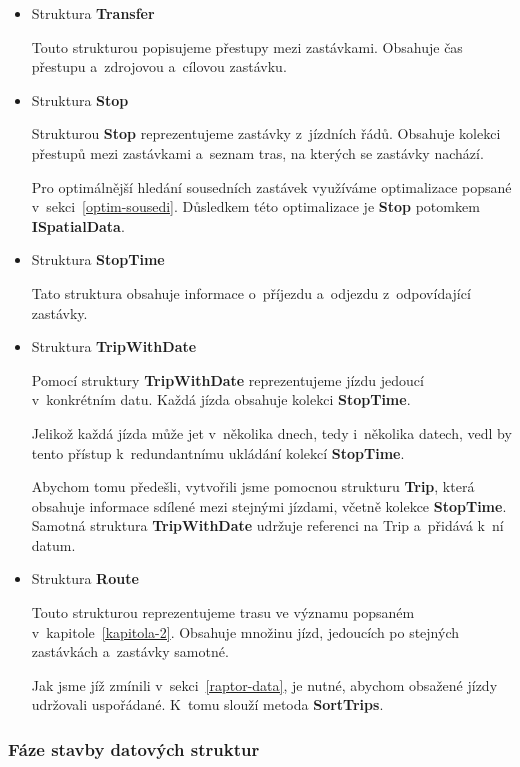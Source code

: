 \begin{itemize}
    \item Struktura \textbf{Transfer}
    
    Touto strukturou popisujeme přestupy mezi zastávkami. Obsahuje čas přestupu a~zdrojovou a~cílovou zastávku.
    
    \item Struktura \textbf{Stop}

    Strukturou \textbf{Stop} reprezentujeme zastávky z~jízdních řádů. Obsahuje kolekci přestupů mezi zastávkami a~seznam tras, na kterých se zastávky nachází.
    
    Pro optimálnější hledání sousedních zastávek využíváme optimalizace popsané v~sekci~\ref{optim-sousedi}. Důsledkem této optimalizace je \textbf{Stop} potomkem \textbf{ISpatialData}.

    \item Struktura \textbf{StopTime}
    
    Tato struktura obsahuje informace o~příjezdu a~odjezdu z~odpovídající zastávky.

    \item Struktura \textbf{TripWithDate}\label{TripWithDate}
    
    Pomocí struktury \textbf{TripWithDate} reprezentujeme jízdu jedoucí v~konkrétním datu. Každá jízda obsahuje kolekci \textbf{StopTime}.
    
    Jelikož každá jízda může jet v~několika dnech, tedy i~několika datech, vedl by tento přístup k~redundantnímu ukládání kolekcí \textbf{StopTime}.
    
    Abychom tomu předešli, vytvořili jsme pomocnou strukturu \textbf{Trip}, která obsahuje informace sdílené mezi stejnými jízdami, včetně kolekce \textbf{StopTime}. Samotná struktura \textbf{TripWithDate} udržuje referenci na Trip a~přidává k~ní datum.
    
    \item Struktura \textbf{Route}
    
    Touto strukturou reprezentujeme trasu ve významu popsaném v~kapitole~\ref{kapitola-2}. Obsahuje množinu jízd, jedoucích po stejných zastávkách a~zastávky samotné.
    
    Jak jsme jíž zmínili v~sekci~\ref{raptor-data}, je nutné, abychom  obsažené jízdy udržovali uspořádané. K~tomu slouží metoda \textbf{SortTrips}.
\end{itemize}

\subsubsection{Fáze stavby datových struktur}

